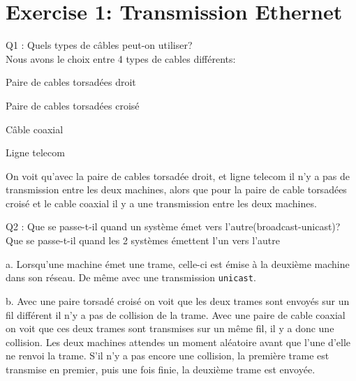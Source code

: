 \documentclass[11pt, openright]{book}
\begin{document}




\newpage

\section{Exercise 1: Transmission Ethernet}

\begin{dent}{Q1 :} Quels types de câbles peut-on utiliser?\\
	Nous avons le choix entre 4 types de cables différents: 
	\begin{items}{-15pt}{-15pt}
		\item Paire de cables torsadées droit 
		\item Paire de cables torsadées croisé
		\item Câble coaxial
		\item Ligne telecom
	\end{items}
	On voit qu'avec la paire de cables torsadée droit, et ligne telecom il n'y a pas de transmission entre les deux machines, alors que pour la paire de cable torsadées croisé et le cable coaxial il y a une transmission entre les deux machines.
\end{dent}

\begin{dent}{Q2 :} Que se passe-t-il quand un système émet vers l'autre(broadcast-unicast)? Que se passe-t-il quand les 2 systèmes émettent l'un vers l'autre\\
	\begin{enum}{-15pt}{-15pt}
		\item[a.] Lorsqu'une machine émet une trame, celle-ci est émise à la deuxième machine dans son réseau. De même avec une transmission \texttt{unicast}.
		\item[b.] Avec une paire torsadé croisé on voit que les deux trames sont envoyés sur un fil différent il n'y a pas de collision de la trame. Avec une paire de cable coaxial on voit que ces deux trames sont transmises sur un même fil, il y a donc une collision. Les deux machines attendes un moment aléatoire avant que l'une d'elle ne renvoi la trame. S'il n'y a pas encore une collision, la première trame est transmise en premier, puis une fois finie, la deuxième trame est envoyée. 
	\end{enum}
\end{dent}
\end{document}
